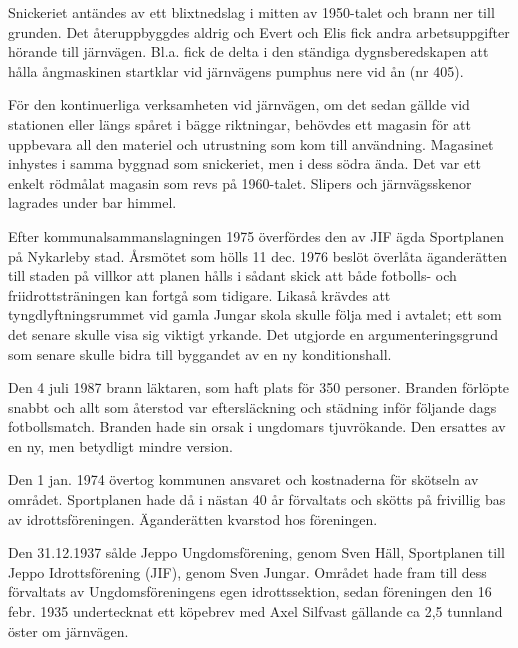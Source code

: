 {Snickeriet antändes av ett blixtnedslag i mitten av 1950-talet och brann ner till grunden. Det återuppbyggdes aldrig och Evert och Elis fick andra arbetsuppgifter hörande till järnvägen. Bl.a. fick de delta i den ständiga dygnsberedskapen att hålla ångmaskinen startklar vid järnvägens pumphus nere vid ån (nr 405).




\jhnooccupant{}


För den kontinuerliga verksamheten vid järnvägen, om det sedan gällde vid stationen eller längs spåret i bägge riktningar, behövdes ett magasin för att uppbevara all den materiel och utrustning som kom till användning. Magasinet inhystes i samma byggnad som snickeriet, men i dess södra ända. Det var ett enkelt rödmålat magasin som revs på 1960-talet. Slipers och järnvägsskenor lagrades under bar himmel.






Efter kommunalsammanslagningen 1975 överfördes den av JIF ägda Sportplanen på Nykarleby stad. Årsmötet som hölls 11 dec. 1976 beslöt överlåta äganderätten till staden på villkor att planen hålls i sådant skick  att både fotbolls- och friidrottsträningen kan fortgå som tidigare. Likaså krävdes att tyngdlyftningsrummet vid gamla Jungar skola skulle följa med i avtalet; ett som det senare skulle visa sig viktigt yrkande. Det utgjorde en argumenteringsgrund som senare skulle bidra till byggandet av en ny konditionshall.

Den 4 juli 1987 brann läktaren, som  haft plats för 350 personer. Branden förlöpte snabbt och allt som återstod var eftersläckning och städning inför följande dags fotbollsmatch. Branden hade sin orsak i ungdomars tjuvrökande. Den ersattes av en ny, men betydligt mindre version.


Den 1 jan. 1974 övertog kommunen ansvaret och kostnaderna för skötseln av området. Sportplanen hade då i nästan 40 år förvaltats och skötts på frivillig bas av idrottsföreningen. Äganderätten kvarstod hos föreningen.\jhvspace{}


Den 31.12.1937 sålde Jeppo Ungdomsförening, genom Sven Häll, Sportplanen till Jeppo Idrottsförening (JIF), genom Sven Jungar. Området hade fram till dess förvaltats av Ungdomsföreningens egen idrottssektion, sedan föreningen den 16 febr. 1935 undertecknat ett köpebrev med Axel Silfvast gällande ca 2,5 tunnland öster om järnvägen.

}
